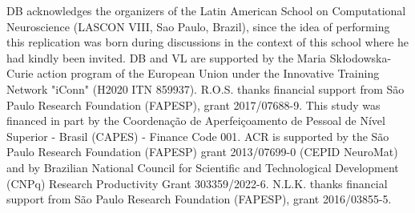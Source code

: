 DB acknowledges the organizers of the Latin American School on Computational Neuroscience (LASCON VIII, Sao Paulo, Brazil), since the idea of performing this replication was born during discussions in the context of this school where he had kindly been invited. DB and VL are supported by the Maria Sk\l odowska-Curie action program of the European Union under the Innovative Training Network "iConn" (H2020 ITN 859937). R.O.S. thanks financial support from São Paulo Research Foundation (FAPESP), grant 2017/07688-9. This study was financed in part by the Coordenação de Aperfeiçoamento de Pessoal de Nível Superior - Brasil (CAPES) - Finance Code 001. ACR is supported by the São Paulo Research Foundation (FAPESP) grant 2013/07699-0 (CEPID NeuroMat) and by Brazilian National Council for Scientific and Technological Development (CNPq) Research Productivity Grant 303359/2022-6. N.L.K. thanks financial support from São Paulo Research Foundation (FAPESP), grant 2016/03855-5. 

